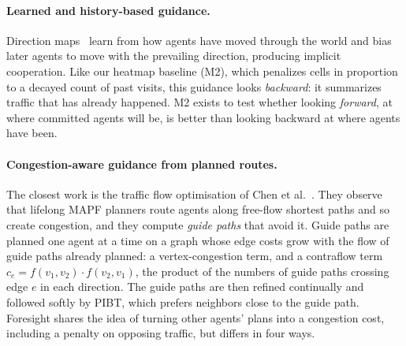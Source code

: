 \paragraph{Learned and history-based guidance.}
Direction maps~\cite{jansen2008direction} learn from how agents have moved
through the world and bias later agents to move with the prevailing direction,
producing implicit cooperation. Like our heatmap baseline (M2), which penalizes
cells in proportion to a decayed count of past visits, this guidance looks
\emph{backward}: it summarizes traffic that has already happened. M2 exists to
test whether looking \emph{forward}, at where committed agents will be, is
better than looking backward at where agents have been.

\paragraph{Congestion-aware guidance from planned routes.}
The closest work is the traffic flow optimisation of Chen et
al.~\cite{chen2024traffic}. They observe that lifelong MAPF planners route
agents along free-flow shortest paths and so create congestion, and they
compute \emph{guide paths} that avoid it. Guide paths are planned one agent at a
time on a graph whose edge costs grow with the flow of guide paths already
planned: a vertex-congestion term, and a contraflow term
$c_e = f(v_1,v_2)\cdot f(v_2,v_1)$, the product of the numbers of guide paths
crossing edge $e$ in each direction. The guide paths are then refined
continually and followed softly by PIBT, which prefers neighbors close to the
guide path. Foresight shares the idea of turning other agents' plans into a
congestion cost, including a penalty on opposing traffic, but differs in four
ways.
